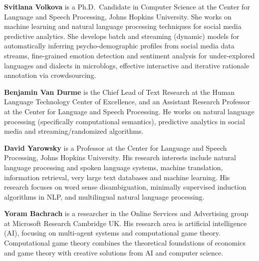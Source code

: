\begin{bio}
\small

{\bfseries Svitlana Volkova} is a Ph.D.\ Candidate in Computer Science at the Center for
Language and Speech Processing, Johns Hopkins University. She works on
machine learning and natural language processing techniques for social
media predictive analytics. She develops batch and streaming (dynamic)
models for automatically inferring psycho-demographic profiles from
social media data streams, fine-grained emotion detection and
sentiment analysis for under-explored languages and dialects in
microblogs, effective interactive and iterative rationale annotation
via crowdsourcing.

{\bfseries Benjamin Van Durme} is the Chief Lead of Text Research at
the Human Language Technology Center of Excellence, and an Assistant
Research Professor at the Center for Language and Speech
Processing. He works on natural language processing (specifically
computational semantics), predictive analytics in social media and
streaming/randomized algorithms.

{\bfseries David Yarowsky} is a Professor at the Center for Language
and Speech Processing, Johns Hopkins University. His research
interests include natural language processing and spoken language
systems, machine translation, information retrieval, very large text
databases and machine learning. His research focuses on word sense
disambiguation, minimally supervised induction algorithms in NLP, and
multilingual natural language processing.

{\bfseries Yoram Bachrach} is a researcher in the Online Services and
Advertising group at Microsoft Research Cambridge UK. His research
area is artificial intelligence (AI), focusing on multi-agent systems
and computational game theory. Computational game theory combines the
theoretical foundations of economics and game theory with creative
solutions from AI and computer science.
\end{bio}

